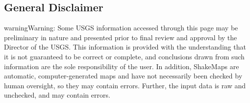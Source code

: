 \documentclass[letterpaper,10pt,english]{sphinxmanual}
\begin{document}
\subsection{General Disclaimer}
\label{disclaimers:general-disclaimer}
\begin{notice}{warning}{Warning:}
Some USGS information accessed through this page may be preliminary in nature and presented prior to final review and approval by the Director of the USGS. This information is provided with the understanding that it is not guaranteed to be correct or complete, and conclusions drawn from such information are the sole responsibility of the user. In addition, ShakeMaps are automatic, computer-generated maps and have not necessarily been checked by human oversight, so they may contain errors. Further, the input data is raw and unchecked, and may contain errors.
\end{notice}
\end{document}
